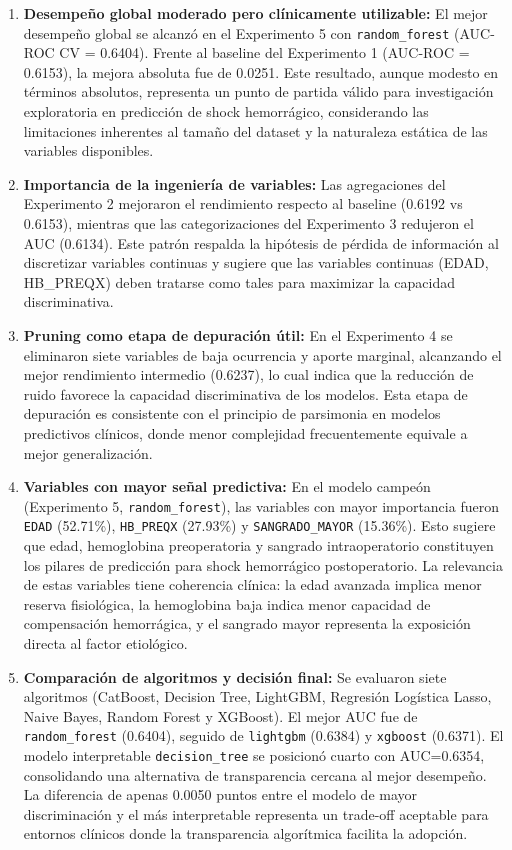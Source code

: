 \begin{enumerate}
    \item \textbf{Desempeño global moderado pero clínicamente utilizable:} El mejor desempeño global se alcanzó en el Experimento 5 con \texttt{random\_forest} (AUC-ROC CV = 0.6404). Frente al baseline del Experimento 1 (AUC-ROC = 0.6153), la mejora absoluta fue de 0.0251. Este resultado, aunque modesto en términos absolutos, representa un punto de partida válido para investigación exploratoria en predicción de shock hemorrágico, considerando las limitaciones inherentes al tamaño del dataset y la naturaleza estática de las variables disponibles.

    \item \textbf{Importancia de la ingeniería de variables:} Las agregaciones del Experimento 2 mejoraron el rendimiento respecto al baseline (0.6192 vs 0.6153), mientras que las categorizaciones del Experimento 3 redujeron el AUC (0.6134). Este patrón respalda la hipótesis de pérdida de información al discretizar variables continuas \cite{ma2023} y sugiere que las variables continuas (EDAD, HB\_PREQX) deben tratarse como tales para maximizar la capacidad discriminativa.

    \item \textbf{Pruning como etapa de depuración útil:} En el Experimento 4 se eliminaron siete variables de baja ocurrencia y aporte marginal, alcanzando el mejor rendimiento intermedio (0.6237), lo cual indica que la reducción de ruido favorece la capacidad discriminativa de los modelos. Esta etapa de depuración es consistente con el principio de parsimonia en modelos predictivos clínicos, donde menor complejidad frecuentemente equivale a mejor generalización.

    \item \textbf{Variables con mayor señal predictiva:} En el modelo campeón (Experimento 5, \texttt{random\_forest}), las variables con mayor importancia fueron \texttt{EDAD} (52.71\%), \texttt{HB\_PREQX} (27.93\%) y \texttt{SANGRADO\_MAYOR} (15.36\%). Esto sugiere que edad, hemoglobina preoperatoria y sangrado intraoperatorio constituyen los pilares de predicción para shock hemorrágico postoperatorio. La relevancia de estas variables tiene coherencia clínica: la edad avanzada implica menor reserva fisiológica, la hemoglobina baja indica menor capacidad de compensación hemorrágica, y el sangrado mayor representa la exposición directa al factor etiológico.

    \item \textbf{Comparación de algoritmos y decisión final:} Se evaluaron siete algoritmos (CatBoost, Decision Tree, LightGBM, Regresión Logística Lasso, Naive Bayes, Random Forest y XGBoost). El mejor AUC fue de \texttt{random\_forest} (0.6404), seguido de \texttt{lightgbm} (0.6384) y \texttt{xgboost} (0.6371). El modelo interpretable \texttt{decision\_tree} se posicionó cuarto con AUC=0.6354, consolidando una alternativa de transparencia cercana al mejor desempeño. La diferencia de apenas 0.0050 puntos entre el modelo de mayor discriminación y el más interpretable representa un trade-off aceptable para entornos clínicos donde la transparencia algorítmica facilita la adopción.


\end{enumerate}

